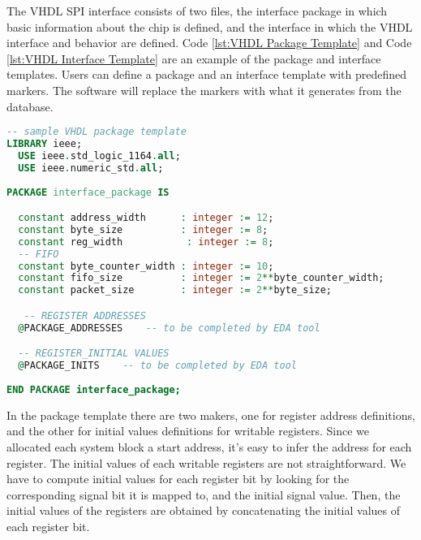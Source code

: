 The VHDL SPI interface consists of two files, the interface package in which basic information about the chip is defined, and the interface in which the VHDL interface and behavior are defined. Code \ref{lst:VHDL Package Template} and Code \ref{lst:VHDL Interface Template} are an example of the package and interface templates. Users can define a package and an interface template with predefined markers. The software will replace the markers with what it generates from the database.

\begin{lstlisting}[language=VHDL, caption={VHDL Package Template\label{lst:VHDL Package Template}}]
-- sample VHDL package template
LIBRARY ieee;
  USE ieee.std_logic_1164.all;
  USE ieee.numeric_std.all;
  
PACKAGE interface_package IS

  constant address_width      : integer := 12;
  constant byte_size          : integer := 8;
  constant reg_width           : integer := 8;
  -- FIFO
  constant byte_counter_width : integer := 10;
  constant fifo_size          : integer := 2**byte_counter_width;
  constant packet_size        : integer := 2**byte_size;

   -- REGISTER ADDRESSES
  @PACKAGE_ADDRESSES    -- to be completed by EDA tool

  -- REGISTER_INITIAL VALUES
  @PACKAGE_INITS    -- to be completed by EDA tool
  
END PACKAGE interface_package;
\end{lstlisting}

In the package template there are two makers, one for register address definitions, and the other for initial values definitions for writable registers. Since we allocated each system block a start address, it's easy to infer the address for each register. The initial values of each writable registers are not straightforward. We have to compute initial values for each register bit by looking for the corresponding signal bit it is mapped to, and the initial signal value. Then, the initial values of the registers are obtained by concatenating the initial values of each register bit.

